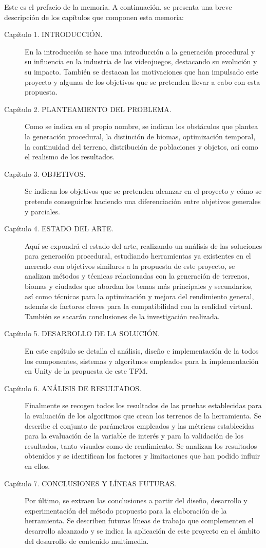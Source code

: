 Este es el prefacio de la memoria. A continuación, se presenta una breve descripción de los capítulos que componen esta memoria:

\begin{description}
  \item[Capítulo 1. INTRODUCCIÓN.] En la introducción se hace una introducción a la generación procedural y su influencia en la industria de los videojuegos, destacando su evolución y su impacto. También se destacan las motivaciones que han impulsado este proyecto y algunas de los objetivos que se pretenden llevar a cabo con esta propuesta. 
  
  \item[Capítulo 2. PLANTEAMIENTO DEL PROBLEMA.] Como se indica en el propio nombre, se indican los obstáculos que plantea la generación procedural, la distinción de biomas, optimización temporal, la continuidad del terreno, distribución de poblaciones y objetos, así como el realismo de los resultados.
  
  \item[Capítulo 3. OBJETIVOS.] Se indican los objetivos que se pretenden alcanzar en el proyecto y cómo se pretende conseguirlos haciendo una diferenciación entre objetivos generales y parciales.

  \item[Capítulo 4. ESTADO DEL ARTE.] Aquí se expondrá el estado del arte, realizando un análisis de las soluciones para generación procedural, estudiando herramientas ya existentes en el mercado con objetivos similares a la propuesta de este proyecto, se analizan métodos y técnicas relacionadas con la generación de terrenos, biomas y ciudades que abordan los temas más principales y secundarios, así como técnicas para la optimización y mejora del rendimiento general, además de factores claves para la compatibilidad con la realidad virtual. También se sacarán conclusiones de la investigación realizada.

  \item[Capítulo 5. DESARROLLO DE LA SOLUCIÓN.] En este capítulo se detalla el análisis, diseño e implementación de la todos los componentes, sistemas y algoritmos empleados para la implementación en Unity de la propuesta de este TFM.

  \item[Capítulo 6. ANÁLISIS DE RESULTADOS.] Finalmente se recogen todos los resultados de las pruebas establecidas para la evaluación de los algoritmos que crean los terrenos de la herramienta. Se describe el conjunto de parámetros empleados y las métricas establecidas para la evaluación de la variable de interés y para la validación de los resultados, tanto visuales como de rendimiento. Se analizan los resultados obtenidos y se identifican los factores y limitaciones que han podido influir en ellos.

  \item[Capítulo 7. CONCLUSIONES Y LÍNEAS FUTURAS.] Por último, se extraen las conclusiones a partir del diseño, desarrollo y experimentación del método propuesto para la elaboración de la herramienta. Se describen futuras líneas de trabajo que complementen el desarrollo alcanzado y se indica la aplicación de este proyecto en el ámbito del desarrollo de contenido multimedia.
\end{description}